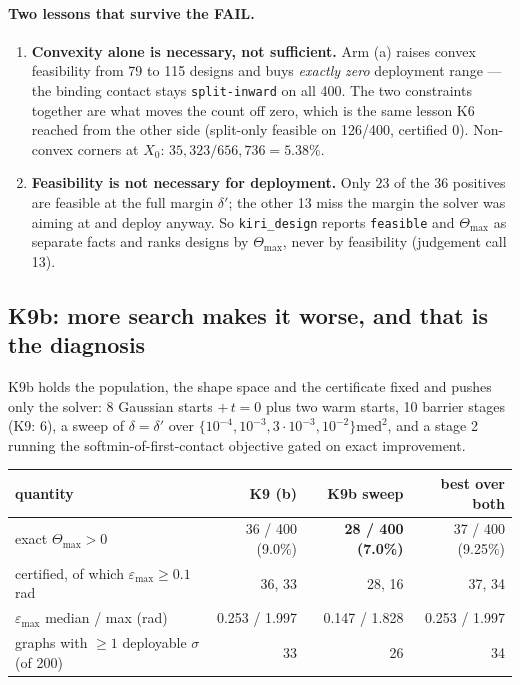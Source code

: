\documentclass[11pt,a4paper]{article}
\theoremstyle{definition}
\newcommand{\Tmax}{\Theta_{\max}}
\newcommand{\file}[1]{\texttt{\small #1}}
\begin{document}
\paragraph{Two lessons that survive the FAIL.}
\begin{enumerate}\itemsep2pt
\item \textbf{Convexity alone is necessary, not sufficient.} Arm (a) raises convex feasibility
from 79 to 115 designs and buys \emph{exactly zero} deployment range --- the binding contact
stays \texttt{split-inward} on all 400. The two constraints together are what moves the count
off zero, which is the same lesson K6 reached from the other side (split-only feasible on
126/400, certified 0). Non-convex corners at $X_0$: $35{,}323/656{,}736 = 5.38\%$.
\item \textbf{Feasibility is not necessary for deployment.} Only $23$ of the $36$ positives
are feasible at the full margin $\delta'$; the other 13 miss the margin the solver was aiming
at and deploy anyway. So \file{kiri\_design} reports \texttt{feasible} and $\Tmax$ as separate
facts and ranks designs by $\Tmax$, never by feasibility (judgement call 13).
\end{enumerate}

\subsection{K9b: more search makes it worse, and that is the diagnosis}

K9b holds the population, the shape space and the certificate fixed and pushes only the
solver: 8 Gaussian starts $+\,t=0$ plus two warm starts, 10 barrier stages (K9: 6), a sweep of
$\delta=\delta'$ over $\{10^{-4},10^{-3},3\!\cdot\!10^{-3},10^{-2}\}\mathrm{med}^2$, and a
stage 2 running the softmin-of-first-contact objective gated on exact improvement.

\begin{center}
\small
\begin{tabular}{@{}lrrr@{}}
\toprule
quantity & K9 (b) & \textbf{K9b sweep} & best over both \\
\midrule
exact $\Tmax>0$ & 36 / 400 (9.0\%) & \textbf{28 / 400 (7.0\%)} & 37 / 400 (9.25\%) \\
certified, of which $\varepsilon_{\max}\ge0.1$ rad & 36, 33 & 28, 16 & 37, 34 \\
$\varepsilon_{\max}$ median / max (rad) & 0.253 / 1.997 & 0.147 / 1.828 & 0.253 / 1.997 \\
graphs with $\ge1$ deployable $\sigma$ (of 200) & 33 & 26 & 34 \\
\bottomrule
\end{tabular}
\end{center}
\end{document}
